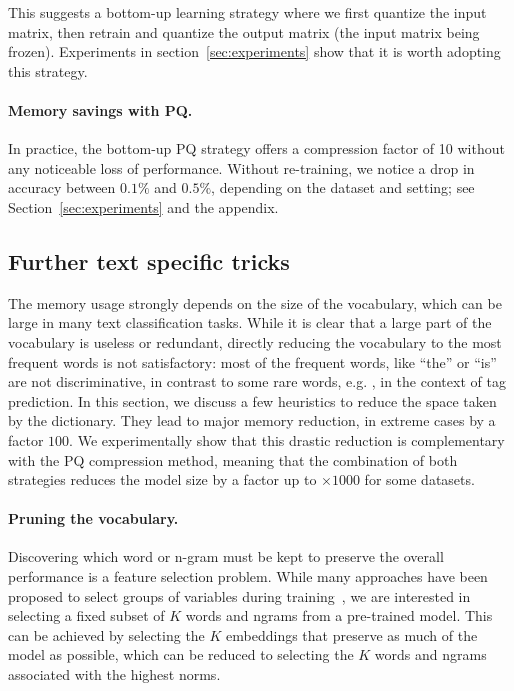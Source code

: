 This suggests a bottom-up learning strategy where we first quantize the input matrix, then retrain and quantize the output matrix (the input matrix being frozen). Experiments in
section~\ref{sec:experiments} show that it is worth adopting this strategy.  

\paragraph{Memory savings with PQ.} In practice, the bottom-up PQ strategy offers a compression factor of 10 without any noticeable loss of performance. Without re-training, we notice a drop in accuracy between $0.1\%$ and $0.5\%$, depending on the dataset and setting; see Section~\ref{sec:experiments} and the appendix. 

\subsection{Further text specific tricks}
\label{sec:tricks}

The memory usage strongly depends on the size of the vocabulary, which can be large in many text classification tasks. While it is clear that a large part of the vocabulary is useless or redundant, directly reducing the vocabulary to the most frequent words is not satisfactory: most of the frequent words, like ``the'' or ``is'' are not discriminative, in contrast to some rare words, e.g. , in the context of tag prediction. In this section, we discuss a few heuristics to reduce the space taken by the dictionary. They lead to major memory reduction, in extreme cases by a factor $100$. We experimentally show that this drastic reduction is complementary with the PQ compression method, meaning that the  combination of both strategies reduces the model size by a factor up to $\times 1000$ for some datasets. 

\paragraph{Pruning the vocabulary.} Discovering which word or n-gram must be kept to preserve the overall performance is a feature selection problem.  While many approaches have been proposed to select groups of variables during training~\citep{BJ12,M08}, we are interested in selecting a fixed subset of $K$ words and ngrams from a pre-trained model. This can be achieved by selecting the $K$ embeddings that preserve as much of the model as possible, which can be reduced to selecting the $K$ words and ngrams associated with the highest norms.

